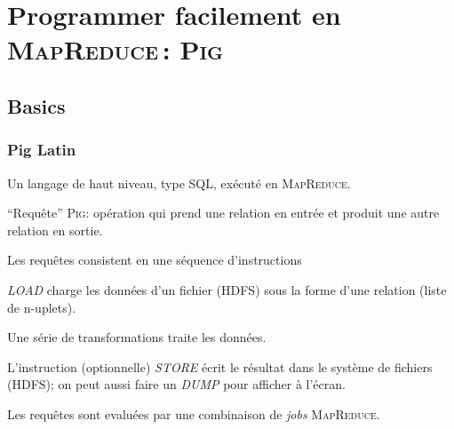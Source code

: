 

\newcommand{\map}{\mathop{\mathit{map}}}
\newcommand{\reduce}{\mathop{\mathit{reduce}}}
\newcommand{\mapreduce}{\textsc{MapReduce}}
\newcommand{\shuffle}{\mathop{\mathit{shuffle}}}
\newcommand{\pig}{\textsc{Pig}}

\section{Programmer facilement en \mapreduce\,: \pig}


\subsection{Basics}
\begin{frame}
\frametitle{Pig Latin}

Un langage de haut niveau, type SQL, exécuté en  \mapreduce.

\vfill

``Requête'' \pig :  opération qui prend une \alert{relation} en entrée
et produit une autre relation en sortie.

\vfill

Les requêtes consistent en une \alert{séquence} d'instructions
\begin{redbullet}
 \item  \textit{LOAD} charge les données d'un fichier (HDFS)
       sous la forme d'une \alert{relation} (liste de n-uplets).
   \item Une série de transformations traite les données.
   \item L'instruction (optionnelle) \textit{STORE} écrit le résultat dans le système
       de fichiers (HDFS); on peut aussi faire un 
        \textit{DUMP} pour afficher à l'écran.
\end{redbullet}

\vfill

Les requêtes sont evaluées par une \alert{combinaison} de \textit{jobs} \mapreduce.
\end{frame}

